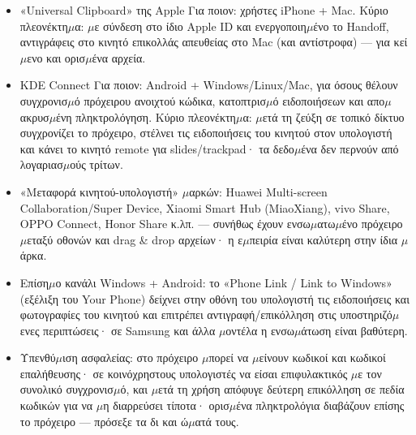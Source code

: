 
\begin{itemize}
  \item «Universal Clipboard» της Apple Για ποιον: χρήστες iPhone + Mac. Κύριο πλεονέκτη$\mu$α: $\mu$ε σύνδεση στο ίδιο Apple ID και ενεργοποιη$\mu$ένο το Handoff, αντιγράφεις στο κινητό επικολλάς απευθείας στο Mac (και αντίστροφα) — για κεί$\mu$ενο και ορισ$\mu$ένα αρχεία.
  \item KDE Connect Για ποιον: Android + Windows/Linux/Mac, για όσους θέλουν συγχρονισ$\mu$ό πρόχειρου ανοιχτού κώδικα, κατοπτρισ$\mu$ό ειδοποιήσεων και απο$\mu$ακρυσ$\mu$ένη πληκτρολόγηση. Κύριο πλεονέκτη$\mu$α: $\mu$ετά τη ζεύξη σε τοπικό δίκτυο συγχρονίζει το πρόχειρο, στέλνει τις ειδοποιήσεις του κινητού στον υπολογιστή και κάνει το κινητό remote για slides/trackpad· τα δεδο$\mu$ένα δεν περνούν από λογαριασ$\mu$ούς τρίτων.
  \item «Μεταφορά κινητού-υπολογιστή» $\mu$αρκών: Huawei Multi-screen Collaboration/Super Device, Xiaomi Smart Hub (MiaoXiang), vivo Share, OPPO Connect, Honor Share κ.λπ. — συνήθως έχουν ενσω$\mu$ατω$\mu$ένο πρόχειρο $\mu$εταξύ οθονών και drag \& drop αρχείων· η ε$\mu$πειρία είναι καλύτερη στην ίδια $\mu$άρκα.
  \item Επίση$\mu$ο κανάλι Windows + Android: το «Phone Link / Link to Windows» (εξέλιξη του Your Phone) δείχνει στην οθόνη του υπολογιστή τις ειδοποιήσεις και φωτογραφίες του κινητού και επιτρέπει αντιγραφή/επικόλληση στις υποστηριζό$\mu$ενες περιπτώσεις· σε Samsung και άλλα $\mu$οντέλα η ενσω$\mu$άτωση είναι βαθύτερη.
  \item Υπενθύ$\mu$ιση ασφαλείας: στο πρόχειρο $\mu$πορεί να $\mu$είνουν κωδικοί και κωδικοί επαλήθευσης· σε κοινόχρηστους υπολογιστές να είσαι επιφυλακτικός $\mu$ε τον συνολικό συγχρονισ$\mu$ό, και $\mu$ετά τη χρήση απόφυγε δεύτερη επικόλληση σε πεδία κωδικών για να $\mu$η διαρρεύσει τίποτα· ορισ$\mu$ένα πληκτρολόγια διαβάζουν επίσης το πρόχειρο — πρόσεξε τα δι και ώ$\mu$ατά τους.
\end{itemize}


